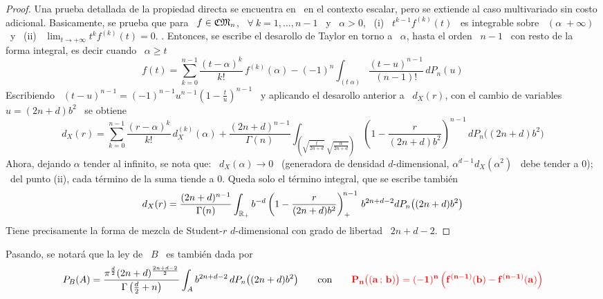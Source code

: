 \begin{proof}
  Una prueba detallada  de la propiedad directa se  encuentra en~\cite{Wil56} en
  el  contexto  escalar,  pero  se  extiende  al  caso  multivariado  sin  costo
  adicional.  Basicamente, se prueba que para \  $f \in \mathfrak{CM}_n$, \ $\forall \: k =
  1,  \ldots ,  n-1$ \  y \  $\alpha >  0$, \  (i) \  $t^{k-1} f^{(k)}(t)$  \ es
  integrable sobre \  $(\alpha \; +\infty)$ \ y \  (ii) \ $\displaystyle \lim_{t
    \to +\infty} t^k f^{(k)}(t) = 0$. .   Entonces, se  escribe el  desarollo de Taylor  en torno  a \
  $\alpha$, hasta el  orden \ $n-1$ \  con resto de la forma  integral, es decir
  cuando \ $\alpha \ge t$
  \[
  f(t) =  \sum_{k=0}^{n-1} \frac{(t-\alpha)^k}{k!}  \,  f^{(k)}(\alpha) - (-1)^n
  \int_{(t \; \alpha)} \frac{(t-u)^{n-1}}{(n-1)!}  \, dP_n(u)
  \]
  Escribiendo  \  $(t-u)^{n-1}  =  (-1)^{n-1}  u^{n-1} \left(  1  -  \frac{t}{u}
  \right)^{n-1}$ \ y aplicando el desarollo anterior a \ $d_X(r)$, con el cambio
  de variables $u = (2 n + d) b^2$ \ se obtiene
  \[
  d_X(r)  =  \sum_{k=0}^{n-1}  \frac{(r-\alpha)^k}{k!}  \,  d_X^{(k)}(\alpha)  +
  \frac{(2  n + d)^{n-1}}{\Gamma(n)}  \int_{\left( \sqrt{\frac{t}{2  n +  d}} \;
      \sqrt{\frac{\alpha}{2 n + d}} \right)} \left(  1 - \frac{r}{(2 n + d) b^2}
  \right)^{n-1} \, dP_n\big( (2 n + d) b^2 \big)
  \]
  Ahora, dejando $\alpha$ tender al infinito, se nota que: \ $d_X(\alpha) \to 0$
  \ (generadora de densidad $d$-dimensional, $\alpha^{d-1} d_X(\alpha^2)$ \ debe
  tender a 0); \ del punto (ii), cada  t\'ermino de la suma tiende a 0. Queda solo
  el t\'ermino integral, que se escribe tambi\'en
  \[
  d_X(r) =  \frac{(2 n +  d)^{n-1}}{\Gamma(n)} \int_{\mathbb{R}_+} b^{-d} \left(  1 -
    \frac{r}{(2 n + d) b^2} \right)_+^{\!n-1} \, b^{2 n +d - 2} dP_n\big( (2 n +
  d) b^2 \big)
  \]
  Tiene precisamente la forma de mezcla de Student-$r$ $d$-dimensional con grado
  de libertad \ $2 n + d - 2$.
%
\end{proof}

Pasando, se notar\'a que la ley de \ $B$ \ es tambi\'en dada por
%
\[
P_B(A) = \frac{\pi^{\frac{d}{2}} (2 n + d)^{\frac{2 n + d - 2}{2}}}{\Gamma\left(
    \frac{d}{2} + n \right)}  \int_A b^{2 n + d - 2} \, dP_n\big(  (2 n + d) b^2
\big)  \qquad \mbox{con}  \qquad {\color{red}\bf P_n\big(  (a \, ; \,  b) \big)  =  (-1)^n \left(
    f^{(n-1)}(b) - f^{(n-1)}(a) \right)}
\]


